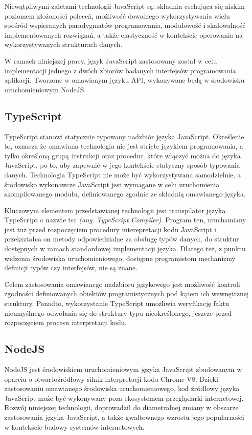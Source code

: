 Niewątpliwymi zaletami technologii JavaScript są: składnia cechująca się niskim poziomem złożoności poleceń, możliwość dowolnego wykorzystywania wielu spośród wspieranych paradygmatów programowania, modułowość i skalowalność implementowanych rozwiązań, a także elastyczność w kontekście operowania na wykorzystywanych strukturach danych.

W ramach niniejszej pracy, język JavaScript zastosowany został w celu implementacji jednego z dwóch zbiorów badanych interfejsów programowania aplikacji. Tworzone w omawianym języku API, wykonywane będą w środowisku uruchomieniowym NodeJS.
\subsection*{TypeScript}
TypeScript stanowi statycznie typowany nadzbiór języka JavaScript. Określenie to, oznacza że omawiana technologia nie jest stricte językiem programowania, a tylko określoną grupą instrukcji oraz procedur, które włączyć można do języka JavaScript, po to, aby zapewnić w jego kontekście statyczny sposób typowania danych. Technologia TypeScript nie może być wykorzystywana samodzielnie, a środowisko wykonawcze JavaScript jest wymagane w celu uruchomienia skompilowanego modułu, definiowanego zgodnie ze składnią omawianego języka.

Kluczowym elementem przedstawianej technologii jest transpilator języka TypeScript o nazwie tsc \textit{(ang. TypeScript Compiler)}. Program ten, uruchamiany jest tuż przed rozpoczęciem procedury interepretacji kodu JavaScript i przekształca on metody odpowiedzialne za obsługę typów danych, do struktur dostępnych w ramach standardowej implementacji języka. Dlatego też, z punktu widzenia środowiska uruchomieniowego, dostępne programistom mechanizmy definicji typów czy interfejsów, nie są znane.

Celem zastosowania omawianego nadzbioru językowego jest możliwość kontroli zgodności definiowanych obiektów programistycznych pod kątem ich wewnętrznej struktury. Ponadto, wykorzystanie TypeScript umożliwia weryfikację faktu nieumyślnego odwołania się do struktury typu nieokreślonego, jeszcze przed rozpoczęciem procesu interpretacji kodu.
\subsection*{NodeJS}
NodeJS jest środowiskiem uruchomieniowym języka JavaScript zbudowanym w oparciu o otwartoźródłowy silnik interpretacji kodu Chrome V8. Dzięki zastosowaniu omawianego środowiska uruchomieniowego, kod źródłowy języka JavaScript może być wykonywany poza ekosystemem przeglądarki internetowej. Rozwój niniejszej technologii, doprowadził do diametralnej zmiany w obszarze zastosowania języka JavaScript, a także gwałtownego wzrostu jego popularności w kontekście budowy systemów internetowych.

